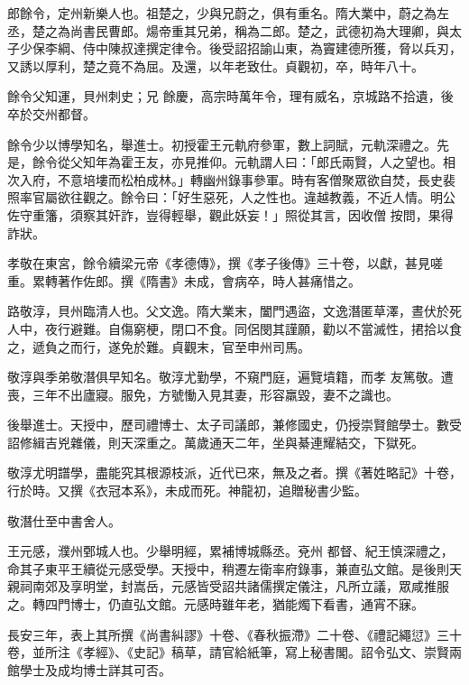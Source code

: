 \begin{pinyinscope}
 郎餘令，定州新樂人也。祖楚之，少與兄蔚之，俱有重名。隋大業中，蔚之為左丞，楚之為尚書民曹郎。煬帝重其兄弟，稱為二郎。楚之，武德初為大理卿，與太子少保李綱、侍中陳叔達撰定律令。後受詔招諭山東，為竇建德所獲，脅以兵刃，又誘以厚利，楚之竟不為屈。及還，以年老致仕。貞觀初，卒，時年八十。



 餘令父知運，貝州刺史；兄
 餘慶，高宗時萬年令，理有威名，京城路不拾遺，後卒於交州都督。



 餘令少以博學知名，舉進士。初授霍王元軌府參軍，數上詞賦，元軌深禮之。先是，餘令從父知年為霍王友，亦見推仰。元軌謂人曰：「郎氏兩賢，人之望也。相次入府，不意培塿而松柏成林。」轉幽州錄事參軍。時有客僧聚眾欲自焚，長史裴照率官屬欲往觀之。餘令曰：「好生惡死，人之性也。違越教義，不近人情。明公佐守重籓，須察其奸詐，豈得輕舉，觀此妖妄！」照從其言，因收僧
 按問，果得詐狀。



 孝敬在東宮，餘令續梁元帝《孝德傳》，撰《孝子後傳》三十卷，以獻，甚見嗟重。累轉著作佐郎。撰《隋書》未成，會病卒，時人甚痛惜之。



 路敬淳，貝州臨清人也。父文逸。隋大業末，闔門遇盜，文逸潛匿草澤，晝伏於死人中，夜行避難。自傷窮梗，閉口不食。同侶閔其謹願，勸以不當滅性，捃拾以食之，遞負之而行，遂免於難。貞觀末，官至申州司馬。



 敬淳與季弟敬潛俱早知名。敬淳尤勤學，不窺門庭，遍覽墳籍，而孝
 友篤敬。遭喪，三年不出廬寢。服免，方號慟入見其妻，形容羸毀，妻不之識也。



 後舉進士。天授中，歷司禮博士、太子司議郎，兼修國史，仍授崇賢館學士。數受詔修緝吉兇雜儀，則天深重之。萬歲通天二年，坐與綦連耀結交，下獄死。



 敬淳尤明譜學，盡能究其根源枝派，近代已來，無及之者。撰《著姓略記》十卷，行於時。又撰《衣冠本系》，未成而死。神龍初，追贈秘書少監。



 敬潛仕至中書舍人。



 王元感，濮州鄄城人也。少舉明經，累補博城縣丞。兗州
 都督、紀王慎深禮之，命其子東平王續從元感受學。天授中，稍遷左衛率府錄事，兼直弘文館。是後則天親祠南郊及享明堂，封嵩岳，元感皆受詔共諸儒撰定儀注，凡所立議，眾咸推服之。轉四門博士，仍直弘文館。元感時雖年老，猶能燭下看書，通宵不寐。



 長安三年，表上其所撰《尚書糾謬》十卷、《春秋振滯》二十卷、《禮記繩愆》三十卷，並所注《孝經》、《史記》稿草，請官給紙筆，寫上秘書閣。詔令弘文、崇賢兩館學士及成均博士詳其可否。




\end{pinyinscope}
